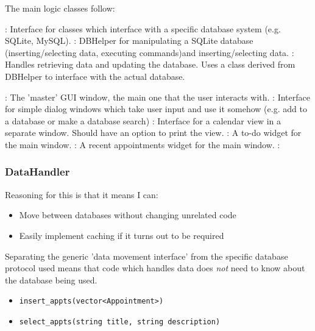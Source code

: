 The main logic classes follow:

\begin{itemize}
    : Interface for classes which interface with a specific
    database system (e.g. SQLite, MySQL).
    : DBHelper for manipulating a SQLite database
    (inserting/selecting data, executing commands)and inserting/selecting data.
    : Handles retrieving data and updating the database.
    Uses a class derived from DBHelper to interface with the actual database.
\end{itemize}


\begin{itemize}
    : The 'master' GUI window, the main one that the
        user interacts with.
    : Interface for simple dialog windows
        which take user input and use it somehow (e.g. add to a database or make
        a database search)
    : Interface for a calendar view in a separate
        window. Should have an option to print the view.
    : A to-do widget for the main window.
    : A recent appointments widget for the main
    window.
    :
\end{itemize}


\subsubsection{DataHandler}

Reasoning for this is that it means I can:

\begin{itemize}
    \item Move between databases without changing unrelated code
    \item Easily implement caching if it turns out to be required
\end{itemize}

Separating the generic 'data movement interface' from the specific database
protocol used means that code which handles data does \textit{not} need to know
about the database being used.

\begin{itemize}
    \item \verb+insert_appts(vector<Appointment>)+
    \item \verb+select_appts(string title, string description)+
\end{itemize}
